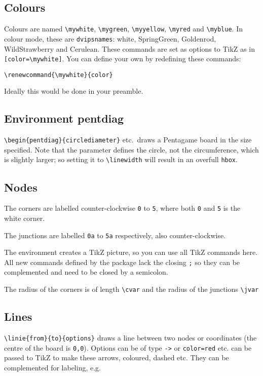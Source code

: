 \documentclass[a5paper]{scrartcl}
\begin{document}
\subsection*{Colours}

Colours are named \verb|\mywhite|, \verb|\mygreen|, \verb|\myyellow|, \verb|\myred| and \verb|\myblue|. In colour mode, these are \verb|dvipsnames|: white, SpringGreen, Goldenrod, WildStrawberry and Cerulean. These commands are set as options to TikZ as in \verb|[color=\mywhite]|. You can define your own by redefining these commands:

\verb|\renewcommand{\mywhite}{color}|

Ideally this would be done in your preamble.


\subsection*{Environment pentdiag}

\verb|\begin{pentdiag}{circlediameter}| etc.~draws a Pentagame board in the size specified. Note that the parameter defines the circle, not the circumference, which is slightly larger; so setting it to \verb|\linewidth| will result in an overfull \verb|hbox|.

\subsection*{Nodes}

The corners are labelled counter-clockwise \verb|0| to \verb|5|, where both \verb|0| and \verb|5| is the white corner.  

The junctions are labelled \verb|0a| to \verb|5a| respectively, also counter-clockwise.

The environment creates a TikZ picture, so you can use all TikZ commands here. All new commands defined by the package lack the closing \verb|;| so they can be complemented and need to be closed by a semicolon. 

The radius of the corners is of length \verb|\cvar| and the radius of the junctions \verb|\jvar|

\subsection*{Lines}

\verb|\linie{from}{to}{options}| draws a line between two nodes or coordinates (the centre of the board is \verb|0,0|). Options can be of type \verb|->| or \verb|color=red| etc. can be passed to TikZ to make these arrows, coloured, dashed etc. They can be complemented for labeling, e.g.
\end{document}
